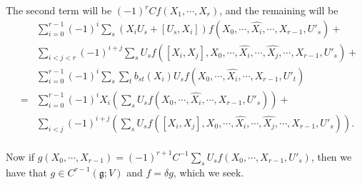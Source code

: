 \documentclass{article}
\newcommand{\lie}[1]{\mathfrak{#1}}
\begin{document}
The second term will be $(-1)^r Cf(X_1, \cdots, X_r)$, and the remaining will be 
{\small
\begin{eqnarray*}
  & & \sum_{i = 0}^{r - 1} (-1)^i \sum_s (X_i U_s + [U_s, X_i]) f(X_0, \cdots, \hat{X_i}, \cdots, X_{r - 1}, U'_s) + \\
  & & \sum_{i < j < r} (-1)^{i + j} \sum_s U_s f([X_i, X_j], X_0, \cdots, \hat{X_i}, \cdots, \hat{X_j}, \cdots, X_{r - 1}, U'_s) + \\
  & & \sum_{i = 0}^{r - 1} (-1)^i \sum_s \sum_t b_{st}(X_i) U_s f(X_0, \cdots, \hat{X_i}, \cdots, X_{r - 1}, U'_t) \\
  &=& \sum_{i = 0}^{r - 1} (-1)^i X_i \left( \sum_s U_s f(X_0, \cdots, \hat{X_i}, \cdots, X_{r - 1}, U'_s) \right) + \\ 
  & & \sum_{i < j} (-1)^{i + j} \left( \sum_s U_s f([X_i, X_j], X_0, \cdots, \hat{X_i}, \cdots, \hat{X_j}, \cdots, X_{r - 1}, U'_s) \right). \\
\end{eqnarray*}
}

Now if $g(X_0, \cdots, X_{r - 1}) = (-1)^{r + 1} C^{-1} \sum_s U_s f(X_0, \cdots, X_{r - 1}, U'_s)$, then we have that $g \in C^{r - 1}(\lie{g}; V)$ and $f = \delta g$, which we seek.
\end{document}

